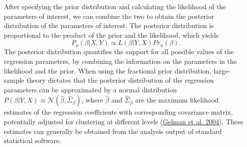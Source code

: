 \documentclass[
  11pt,
]{article}
\begin{document}
After specifying the prior distribution and calculating the likelihood of the parameters of interest, we can combine the two to obtain the posterior distribution of the parameters of interest.
The posterior distribution is proportional to the product of the prior and the likelihood, which yields
\[
P_u(\beta | X, Y) \propto
L(\beta | Y, X) Pr_u(\beta).
\]
The posterior distribution quantifies the support for all possible values of the regression parameters, by combining the information on the parameters in the likelihood and the prior.
When using the fractional prior distribution, large-sample theory dictates that the posterior distribution of the regression parameters can be approximated by a normal distribution \(P(\beta| Y, X) \approx \mathcal{N}(\hat{\beta}, \hat{\Sigma}_{\beta})\), where \(\hat{\beta}\) and \(\hat{\Sigma}_{\beta}\) are the maximum likelihood estimates of the regression coefficients with corresponding covariance matrix, potentially adjusted for clustering at different levels (\protect\hyperlink{ref-bda2013}{Gelman et al. 2004}).
These estimates can generally be obtained from the analysis output of standard statistical software.
\end{document}
